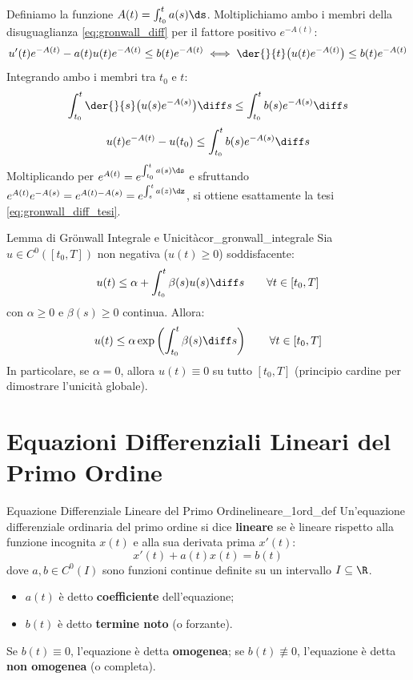 \begin{dimostrazione}
Definiamo la funzione $A(t) = \int_{t_0}^t a(s)\ds$. Moltiplichiamo ambo i membri della disuguaglianza \eqref{eq:gronwall_diff} per il fattore positivo $e^{-A(t)}$:
\[
    u'(t) e^{-A(t)} - a(t) u(t) e^{-A(t)} \le b(t) e^{-A(t)} \iff \der{}{t}\big( u(t) e^{-A(t)} \big) \le b(t) e^{-A(t)}
\]
Integrando ambo i membri tra $t_0$ e $t$:
\[
    \int_{t_0}^t \der{}{s}\big( u(s) e^{-A(s)} \big) \diff s \le \int_{t_0}^t b(s) e^{-A(s)} \diff s
\]
\[
    u(t) e^{-A(t)} - u(t_0) \le \int_{t_0}^t b(s) e^{-A(s)} \diff s
\]
Moltiplicando per $e^{A(t)} = e^{\int_{t_0}^t a(s)\ds}$ e sfruttando $e^{A(t)} e^{-A(s)} = e^{A(t)-A(s)} = e^{\int_s^t a(z)\dz}$, si ottiene esattamente la tesi \eqref{eq:gronwall_diff_tesi}.
\end{dimostrazione}

\begin{corollario}{Lemma di Grönwall Integrale e Unicità}{cor_gronwall_integrale}
Sia $u \in C^0([t_0, T])$ non negativa ($u(t) \ge 0$) soddisfacente:
\[
    u(t) \le \alpha + \int_{t_0}^t \beta(s) u(s) \diff s \qquad \forall t \in [t_0, T]
\]
con $\alpha \ge 0$ e $\beta(s) \ge 0$ continua. Allora:
\begin{equation}
    u(t) \le \alpha \exp\left( \int_{t_0}^t \beta(s) \diff s \right) \qquad \forall t \in [t_0, T]
\end{equation}
In particolare, se $\alpha = 0$, allora $u(t) \equiv 0$ su tutto $[t_0, T]$ (principio cardine per dimostrare l'unicità globale).
\end{corollario}

\newpage

\section{Equazioni Differenziali Lineari del Primo Ordine}
\label{sec:lineari_primo_ordine}

\begin{definizione}{Equazione Differenziale Lineare del Primo Ordine}{lineare_1ord_def}
Un'equazione differenziale ordinaria del primo ordine si dice \textbf{lineare} se è lineare rispetto alla funzione incognita $x(t)$ e alla sua derivata prima $x'(t)$:
\begin{equation}
    \label{eq:lineare_1ord}
    x'(t) + a(t) x(t) = b(t)
\end{equation}
dove $a, b \in C^0(I)$ sono funzioni continue definite su un intervallo $I \subseteq \R$.
\begin{itemize}
    \item $a(t)$ è detto \textbf{coefficiente} dell'equazione;
    \item $b(t)$ è detto \textbf{termine noto} (o forzante).
\end{itemize}
Se $b(t) \equiv 0$, l'equazione è detta \textbf{omogenea}; se $b(t) \not\equiv 0$, l'equazione è detta \textbf{non omogenea} (o completa).
\end{definizione}

